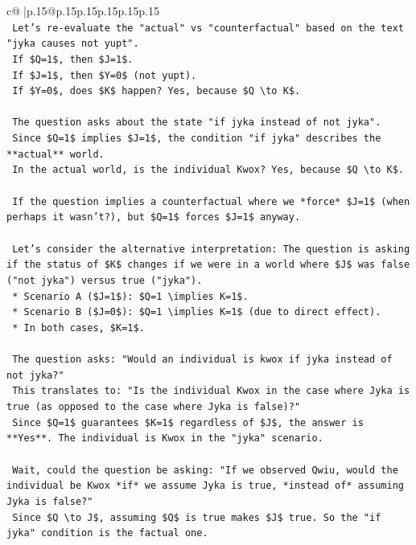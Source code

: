 \documentclass{article}
\begin{document}
{\begin{supertabular}{c@{$\;$}|p{.15\linewidth}@{}p{.15\linewidth}p{.15\linewidth}p{.15\linewidth}p{.15\linewidth}p{.15\linewidth}}
{{{\\ 
\texttt{    Let's re{-}evaluate the "actual" vs "counterfactual" based on the text "jyka causes not yupt".} \\
\texttt{    If \$Q=1\$, then \$J=1\$.} \\
\texttt{    If \$J=1\$, then \$Y=0\$ (not yupt).} \\
\texttt{    If \$Y=0\$, does \$K\$ happen? Yes, because \$Q \textbackslash{}to K\$.} \\
\\ 
\texttt{    The question asks about the state "if jyka instead of not jyka".} \\
\texttt{    Since \$Q=1\$ implies \$J=1\$, the condition "if jyka" describes the **actual** world.} \\
\texttt{    In the actual world, is the individual Kwox? Yes, because \$Q \textbackslash{}to K\$.} \\
\\ 
\texttt{    If the question implies a counterfactual where we *force* \$J=1\$ (when perhaps it wasn't?), but \$Q=1\$ forces \$J=1\$ anyway.} \\
\\ 
\texttt{    Let's consider the alternative interpretation: The question is asking if the status of \$K\$ changes if we were in a world where \$J\$ was false ("not jyka") versus true ("jyka").} \\
\texttt{    *   Scenario A (\$J=1\$): \$Q=1 \textbackslash{}implies K=1\$.} \\
\texttt{    *   Scenario B (\$J=0\$): \$Q=1 \textbackslash{}implies K=1\$ (due to direct effect).} \\
\texttt{    *   In both cases, \$K=1\$.} \\
\\ 
\texttt{    The question asks: "Would an individual is kwox if jyka instead of not jyka?"} \\
\texttt{    This translates to: "Is the individual Kwox in the case where Jyka is true (as opposed to the case where Jyka is false)?"} \\
\texttt{    Since \$Q=1\$ guarantees \$K=1\$ regardless of \$J\$, the answer is **Yes**. The individual is Kwox in the "jyka" scenario.} \\
\\ 
\texttt{    Wait, could the question be asking: "If we observed Qwiu, would the individual be Kwox *if* we assume Jyka is true, *instead of* assuming Jyka is false?"} \\
\texttt{    Since \$Q \textbackslash{}to J\$, assuming \$Q\$ is true makes \$J\$ true. So the "if jyka" condition is the factual one.} \\
}}}
\end{supertabular}}
\end{document}
